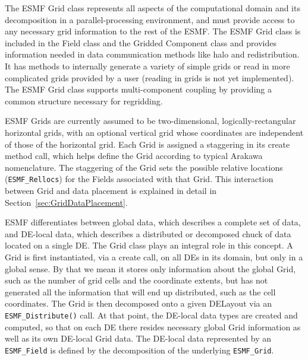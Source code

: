 %


The ESMF Grid class represents all aspects of the computational domain and its
decomposition in a parallel-processing environment, and must provide access to
any necessary grid information to the rest of the ESMF.  The ESMF Grid class
is included in the Field class and the Gridded Component class
and provides information needed in data communication methods like halo and
redistribution.  It has methods to internally generate a variety of
simple grids or read in more complicated grids provided by a user 
(reading in grids is not yet implemented).  The ESMF Grid class supports
multi-component coupling by providing a common structure necessary for regridding.

ESMF Grids are currently assumed to be two-dimensional, logically-rectangular
horizontal grids, with an optional vertical grid whose coordinates are
independent of those of the horizontal grid.  Each Grid is assigned a
staggering in its create method call, which helps define the Grid according
to typical Arakawa nomenclature.  The staggering of the Grid sets the possible
relative locations ({\tt ESMF\_Rellocs}) for the Fields associated with that
Grid.  This interaction between Grid and data placement is explained in detail
in Section~\ref{sec:GridDataPlacement}.

ESMF differentiates between global data, which describes a complete set of data,
and DE-local data, which describes a distributed or decomposed chuck of data
located on a single DE.  The Grid class plays an integral role in this concept.
A Grid is first instantiated, via a create call, on all DEs in its domain, but
only in a global sense.  By that we mean it stores only information about the
global Grid, such as the number of grid cells and the coordinate extents, but
has not generated all the information that will end up distributed, such as the
cell coordinates.  The Grid is then decomposed onto a given DELayout via an
{\tt ESMF\_Distribute()} call.  At that point, the DE-local data types are
created and computed, so that on each DE there resides necessary global Grid
information as well as its own DE-local Grid data.  The DE-local data represented
by an {\tt ESMF\_Field} is defined by the decomposition of the underlying
{\tt ESMF\_Grid}.

